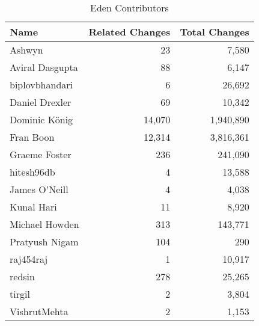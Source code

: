 \documentclass[a4paper,man,natbib,floatsintext]{apa6}
\begin{document}
\begin{table}[ht]
\caption{Eden Contributors}
\label{tab:contribs-1}
\begin{tabular}{|l|r|r|}
\hline
Name            & Related Changes & Total Changes \\ \hline
Ashwyn          & 23              & 7,580         \\ \hline
Aviral Dasgupta & 88              & 6,147         \\ \hline
biplovbhandari  & 6               & 26,692        \\ \hline
Daniel Drexler  & 69              & 10,342        \\ \hline
Dominic König   & 14,070          & 1,940,890     \\ \hline
Fran Boon       & 12,314          & 3,816,361     \\ \hline
Graeme Foster   & 236             & 241,090       \\ \hline
hitesh96db      & 4               & 13,588        \\ \hline
James O'Neill   & 4               & 4,038         \\ \hline
Kunal Hari      & 11              & 8,920         \\ \hline
Michael Howden  & 313             & 143,771       \\ \hline
Pratyush Nigam  & 104             & 290           \\ \hline
raj454raj       & 1               & 10,917        \\ \hline
redsin          & 278             & 25,265        \\ \hline
tirgil          & 2               & 3,804         \\ \hline
VishrutMehta    & 2               & 1,153         \\ \hline
\end{tabular}
\end{table} 
\end{document}
